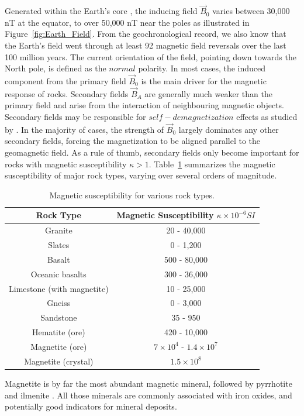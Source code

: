 Generated within the Earth's core \cite[]{Campbell1997}, the inducing field $\vec B_0$ varies between 30,000 nT at the equator, to over 50,000 nT near the poles as illustrated in Figure~\ref{fig:Earth_Field}. From the geochronological record, we also know that the Earth's field went through at least 92 magnetic field reversals over the last 100 million years. The current orientation of the field, pointing down towards the North pole, is defined as the $normal$ polarity.
In most cases, the induced component from the primary field $\vec B_0$ is the main driver for the magnetic response of rocks.
Secondary fields $\vec B_{A}$ are generally much weaker than the primary field and arise from the interaction of neighbouring magnetic objects.
Secondary fields may be responsible for $self-demagnetization$ effects as studied by \cite{LelievreMSc}.
In the majority of cases, the strength of $\vec B_0$ largely dominates any other secondary fields, forcing the magnetization to be aligned parallel to the geomagnetic field.
As a rule of thumb, secondary fields only become important for rocks with magnetic susceptibility $\kappa > 1$.
Table~\ref{tbl:Mag_susc} summarizes the magnetic susceptibility of major rock types, varying over several orders of magnitude.
\begin{table}
\centering
\caption{Magnetic susceptibility for various rock types.}
\label{tbl:Mag_susc}
\renewcommand{\arraystretch}{1.2}
\begin{tabular}{|c|c|}\hline
Rock Type & Magnetic Susceptibility $\kappa \times 10^{-6} SI$ \\ \hline
Granite & 20 - 40,000 \\
Slates & 0 - 1,200 \\
Basalt & 500 - 80,000 \\
Oceanic basalts & 300 - 36,000 \\
Limestone (with magnetite) & 10 - 25,000 \\
Gneiss & 0 - 3,000 \\
Sandstone & 35 - 950 \\
Hematite (ore) & 420 - 10,000 \\
Magnetite (ore) & $7 \times 10^{4}$ - $1.4 \times 10^{7}$ \\
Magnetite (crystal) & $1.5 \times 10^{8}$ \\ \hline
\end{tabular}
\end{table}
Magnetite is by far the most abundant magnetic mineral, followed by pyrrhotite and ilmenite \cite[]{Clark99}.
All those minerals are commonly associated with iron oxides, and potentially good indicators for mineral deposits.


